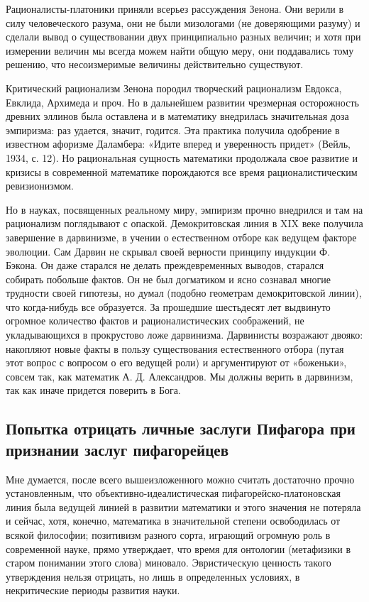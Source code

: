 Рационалисты-платоники приняли всерьез  рассуждения Зенона. Они верили
в силу  человеческого разума, они  не были мизологами  (не доверяющими
разуму)  и сделали  вывод  о существовании  двух принципиально  разных
величин;  и хотя  при измерении  величин мы  всегда можем  найти общую
меру,  они  поддавались  тому   решению,  что  несоизмеримые  величины
действительно существуют.

Критический рационализм Зенона породил творческий рационализм Евдокса,
Евклида,  Архимеда  и  проч.   Но  в  дальнейшем  развитии  чрезмерная
осторожность древних эллинов была  оставлена и в математику внедрилась
значительная  доза  эмпиризма:  раз   удается,  значит,  годится.  Эта
практика  получила одобрение  в известном  афоризме Даламбера:  «Идите
вперед и  уверенность придет»  (Вейль, 1934,  с. 12).  Но рациональная
сущность математики  продолжала свое развитие и  кризисы в современной
математике порождаются все время рационалистическим ревизионизмом.

Но в науках,  посвященных реальному миру, эмпиризм  прочно внедрился и
там на рационализм  поглядывают с опаской. Демокритовская  линия в XIX
веке  получила  завершение  в  дарвинизме,  в  учении  о  естественном
отборе  как ведущем  факторе  эволюции. Сам  Дарвин  не скрывал  своей
верности  принципу индукции  Ф.  Бэкона. Он  даже  старался не  делать
преждевременных выводов, старался собирать  побольше фактов. Он не был
догматиком  и  ясно  сознавал  многие  трудности  своей  гипотезы,  но
думал  (подобно  геометрам  демокритовской  линии),  что  когда-нибудь
все  образуется.  За  прошедшие   шестьдесят  лет  выдвинуто  огромное
количество фактов и  рационалистических соображений, не укладывающихся
в прокрустово ложе дарвинизма.  Дарвинисты возражают двояко: накопляют
новые факты  в пользу  существования естественного отбора  (путая этот
вопрос с вопросом  о его ведущей роли) и  аргументируют от «боженьки»,
совсем  так, как  математик  А.  Д. Александров.  Мы  должны верить  в
дарвинизм, так как иначе придется поверить в Бога.

\subsection{Попытка  отрицать личные  заслуги  Пифагора при  признании
заслуг пифагорейцев}

Мне    думается,   после    всего   вышеизложенного    можно   считать
достаточно   прочно   установленным,  что   объективно-идеалистическая
пифагорейско-платоновская  линия   была  ведущей  линией   в  развитии
математики  и этого  значения  не потеряла  и  сейчас, хотя,  конечно,
математика в  значительной степени  освободилась от  всякой философии;
позитивизм  разного  сорта,  играющий   огромную  роль  в  современной
науке,  прямо  утверждает,  что  время  для  онтологии  (метафизики  в
старом понимании этого слова)  миновало. Эвристическую ценность такого
утверждения  нельзя  отрицать,  но  лишь в  определенных  условиях,  в
некритические периоды развития науки.

